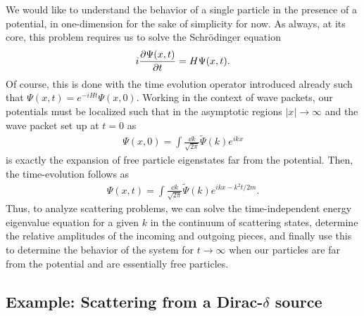 We would like to understand the behavior of a single particle in the presence of a potential, in one-dimension for the sake of simplicity for now.
As always, at its core, this problem requires us to solve the Schr\"{o}dinger equation
\begin{align}
    i \pdv{\Psi(x,t)}{t} = H \Psi(x,t)
.\end{align}
Of course, this is done with the time evolution operator introduced already such that $\Psi(x,t) = e^{-i H t} \Psi(x,0)$.
Working in the context of wave packets, our potentials must be localized such that in the asymptotic regions $|x| \rightarrow \infty$ and the wave packet set up at $t = 0$ as
\begin{align}
    \Psi(x,0) = \int \frac{\dd{k}}{\sqrt{2 \pi}} \widetilde{\Psi}(k) e^{i k x}
\end{align}
is exactly the expansion of free particle eigenstates far from the potential.
Then, the time-evolution follows as
\begin{align}
    \Psi(x,t) = \int \frac{\dd{k}}{\sqrt{2 \pi}} \widetilde{\Psi}(k) e^{i k x - k^2 t / 2m}
.\end{align}
Thus, to analyze scattering problems, we can solve the time-independent energy eigenvalue equation for a given $k$ in the continuum of scattering states, determine the relative amplitudes of the incoming and outgoing pieces, and finally use this to determine the behavior of the system for $t \rightarrow \infty$ when our particles are far from the potential and are essentially free particles.


\subsection{Example: Scattering from a Dirac-$\delta$ source}

